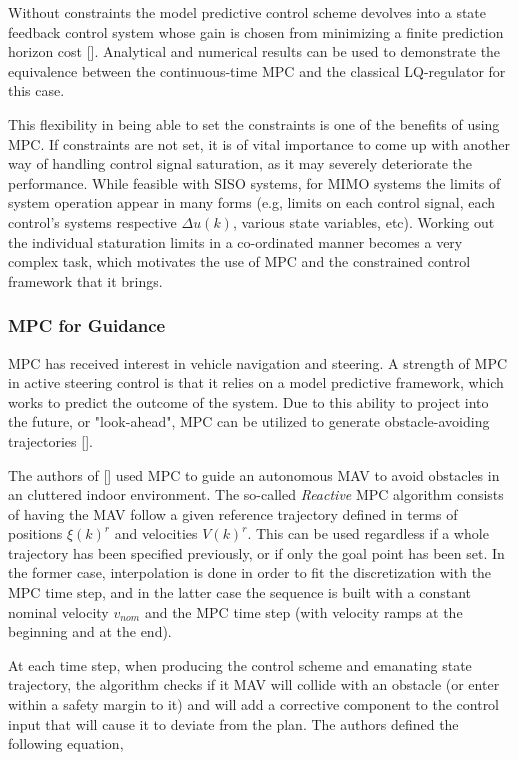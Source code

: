 Without constraints the model predictive control scheme devolves into a state feedback control system whose gain is chosen from minimizing a finite prediction horizon cost [\citeauthor{Wang2009a}]. Analytical and numerical results can be used to demonstrate the equivalence between the continuous-time \gls{MPC} and the classical \gls{LQ}-regulator for this case. 

This flexibility in being able to set the constraints is one of the benefits of using \gls{MPC}. If constraints are not set, it is of vital importance to come up with another way of handling control signal saturation, as it may severely deteriorate the performance. While feasible with \gls{SISO} systems, for \gls{MIMO} systems the limits of system operation appear in many forms (e.g, limits on each control signal, each control's systems respective $\Delta u(k)$, various state variables, etc). Working out the individual staturation limits in a co-ordinated manner becomes a very complex task, which motivates the use of \gls{MPC} and the constrained control framework that it brings.

\subsubsection{MPC for Guidance}\label{subsubsec:MPC4Guidance}

\gls{MPC} has received interest in vehicle navigation and steering. A strength of \gls{MPC} in active steering control is that it relies on a model predictive framework, which works to predict the outcome of the system. Due to this ability to project into the future, or "look-ahead", \gls{MPC} can be utilized to generate obstacle-avoiding trajectories [\citeauthor{Park2009}].

The authors of [\citeauthor{Marzat2017}] used \gls{MPC} to guide an autonomous \gls{MAV} to avoid obstacles in an cluttered indoor environment. The so-called \textit{Reactive} \gls{MPC} algorithm consists of having the \gls{MAV} follow a given reference trajectory defined in terms of positions $\xi(k)^r$ and velocities $V(k)^r$. This can be used regardless if a whole trajectory has been specified previously, or if only the goal point has been set. In the former case, interpolation is done in order to fit the discretization with the \gls{MPC} time step, and in the latter case the sequence is built with a constant nominal velocity $v_{nom}$ and the \gls{MPC} time step (with velocity ramps at the beginning and at the end).

At each time step, when producing the control scheme and emanating state trajectory, the algorithm checks if it \gls{MAV} will collide with an obstacle (or enter within a safety margin to it) and will add a corrective component to the control input that will cause it to deviate from the plan. The authors defined the following equation,

